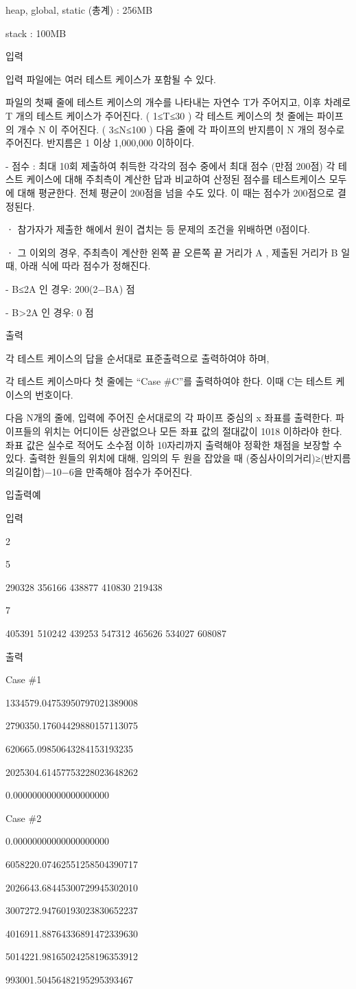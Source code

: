 \documentclass [12pt] {oblivoir}
\begin{document}
heap, global, static (총계) : 256MB

stack : 100MB

입력

입력 파일에는 여러 테스트 케이스가 포함될 수 있다.

파일의 첫째 줄에 테스트 케이스의 개수를 나타내는 자연수 T가 주어지고,
이후 차례로  T 개의 테스트 케이스가 주어진다. ( 1≤T≤30 )
각 테스트 케이스의 첫 줄에는 파이프의 개수 N 이 주어진다. ( 3≤N≤100 )
다음 줄에 각 파이프의 반지름이 N 개의 정수로 주어진다.
반지름은 1 이상 1,000,000 이하이다.

- 점수 : 최대 10회 제출하여 취득한 각각의 점수 중에서 최대 점수 (만점 200점)
각 테스트 케이스에 대해 주최측이 계산한 답과 비교하여 산정된 점수를 테스트케이스 모두에 대해 평균한다. 전체 평균이 200점을 넘을 수도 있다.
이 때는 점수가 200점으로 결정된다.

 ㆍ 참가자가 제출한 해에서 원이 겹치는 등 문제의 조건을 위배하면 0점이다.

 ㆍ 그 이외의 경우, 주최측이 계산한 왼쪽 끝 오른쪽 끝 거리가 A , 제출된 거리가 B 일때, 아래 식에 따라 점수가 정해진다.

    -  B≤2A 인 경우: 200(2−BA) 점

    -  B>2A 인 경우: 0 점

출력

각 테스트 케이스의 답을 순서대로 표준출력으로 출력하여야 하며,

각 테스트 케이스마다 첫 줄에는 “Case \#C”를 출력하여야 한다. 이때 C는 테스트 케이스의 번호이다.

다음 N개의 줄에, 입력에 주어진 순서대로의 각 파이프 중심의 x 좌표를 출력한다.
파이프들의 위치는 어디이든 상관없으나 모든 좌표 값의 절대값이 1018 이하라야 한다.
좌표 값은 실수로 적어도 소수점 이하 10자리까지 출력해야 정확한 채점을 보장할 수 있다.
출력한 원들의 위치에 대해, 임의의 두 원을 잡았을 때 (중심사이의거리)≥(반지름의길이합)−10−6을 만족해야 점수가 주어진다.

입출력예

입력

2

5

290328 356166 438877 410830 219438

7

405391 510242 439253 547312 465626 534027 608087

출력

Case \#1

1334579.04753950797021389008

2790350.17604429880157113075

620665.09850643284153193235

2025304.61457753228023648262

0.00000000000000000000

Case \#2

0.00000000000000000000

6058220.07462551258504390717

2026643.68445300729945302010

3007272.94760193023830652237

4016911.88764336891472339630

5014221.98165024258196353912

993001.50456482195295393467
\end{document}
